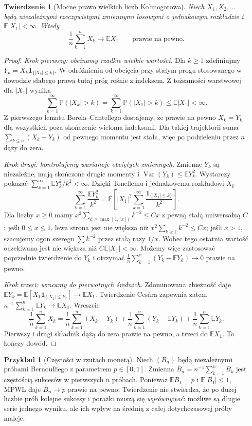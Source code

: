 \documentclass[11pt,a4paper,oneside]{report}
\numberwithin{equation}{chapter}
\theoremstyle{plain}
\newtheorem{twierdzenie}{Twierdzenie}[chapter]
\theoremstyle{definition}
\newtheorem{przyklad}{Przykład}[chapter]
\theoremstyle{remark}
\newcommand{\Prob}{\mathbb{P}}
\newcommand{\E}{\mathbb{E}}
\newcommand{\Var}{\operatorname{Var}}
\newcommand{\ind}[1]{\mathbf{1}_{#1}}
\begin{document}
\begin{twierdzenie}[Mocne prawo wielkich liczb Kołmogorowa]
Niech $X_1,X_2,\ldots$ będą niezależnymi rzeczywistymi
zmiennymi losowymi o jednakowym rozkładzie i
$\E|X_1|<\infty$. Wtedy
\[
\frac1n\sum_{k=1}^n X_k\longrightarrow\E X_1
\qquad\text{prawie na pewno}.
\]
\end{twierdzenie}
\begin{proof}
\emph{Krok pierwszy: obcinamy rzadkie wielkie wartości.}
Dla $k\geq1$ zdefiniujmy
$Y_k=X_k\ind{\{|X_k|\leq k\}}$.
W odróżnieniu od obcięcia przy stałym progu stosowanego
w dowodzie słabego prawa tutaj próg rośnie z indeksem.
Z tożsamości warstwowej dla $|X_1|$ wynika
\[
\sum_{k=1}^\infty\Prob(|X_k|>k)
=\sum_{k=1}^\infty\Prob(|X_1|>k)
\leq\E|X_1|<\infty.
\]
Z pierwszego lematu Borela--Cantellego dostajemy,
że prawie na pewno $X_k=Y_k$ dla wszystkich
poza skończenie wieloma indeksami. Dla takiej
trajektorii suma $\sum_{k\leq n}(X_k-Y_k)$
od pewnego momentu jest stała, więc po podzieleniu
przez $n$ dąży do zera.

\emph{Krok drugi: kontrolujemy wariancje obciętych
zmiennych.} Zmienne $Y_k$ są niezależne, mają skończone
drugie momenty i $\Var(Y_k)\leq\E Y_k^2$.
Wystarczy pokazać
$\sum_{k=1}^\infty\E Y_k^2/k^2<\infty$.
Dzięki Tonellemu i jednakowemu rozkładowi $X_k$
\[
\sum_{k=1}^\infty\frac{\E Y_k^2}{k^2}
=\E\left[|X_1|^2
 \sum_{k=1}^\infty\frac{\ind{\{|X_1|\leq k\}}}{k^2}\right].
\]
Dla liczby $x\geq0$ mamy
$x^2\sum_{k\geq\max(1,\lceil x\rceil)}k^{-2}\leq Cx$
z pewną stałą uniwersalną $C$: jeśli $0\leq x\leq1$,
lewa strona jest nie większa niż
$x^2\sum_{k\geq1}k^{-2}\leq Cx$;
jeśli $x>1$, szacujemy ogon szeregu $\sum k^{-2}$
przez stałą razy $1/x$.
Wobec tego ostatnia wartość oczekiwana jest nie większa
niż $C\E|X_1|<\infty$. Możemy więc zastosować
poprzednie twierdzenie do $Y_k$ i otrzymać
$\frac1n\sum_{k=1}^n(Y_k-\E Y_k)\to0$
prawie na pewno.

\emph{Krok trzeci: wracamy do pierwotnych średnich.}
Zdominowana zbieżność daje
$\E Y_k=\E[X_1\ind{\{|X_1|\leq k\}}]\to\E X_1$.
Twierdzenie Cesàra zapewnia zatem
$n^{-1}\sum_{k=1}^n\E Y_k\to\E X_1$.
Wreszcie
\[
\frac1n\sum_{k=1}^n X_k
=\frac1n\sum_{k=1}^n(X_k-Y_k)
+\frac1n\sum_{k=1}^n(Y_k-\E Y_k)
+\frac1n\sum_{k=1}^n\E Y_k.
\]
Pierwszy i drugi składnik dążą do zera prawie na pewno,
a trzeci do $\E X_1$. To kończy dowód.
\end{proof}

\begin{przyklad}[Częstości w rzutach monetą]
Niech $(B_n)$ będą niezależnymi próbami Bernoulliego
z parametrem $p\in[0,1]$. Zmienna
$\overline B_n=n^{-1}\sum_{k=1}^n B_k$ jest częstością
sukcesów w pierwszych $n$ próbach.
Ponieważ $\E B_1=p$ i $\E|B_1|\leq1$,
MPWL daje $\overline B_n\to p$ prawie na pewno.
Twierdzenie nie stwierdza, że po dużej liczbie prób
kolejne sukcesy i porażki muszą się \emph{wyrównywać}:
możliwe są długie serie jednego wyniku, ale ich wpływ
na średnią z całej dotychczasowej próby maleje.
\end{przyklad}
\end{document}
